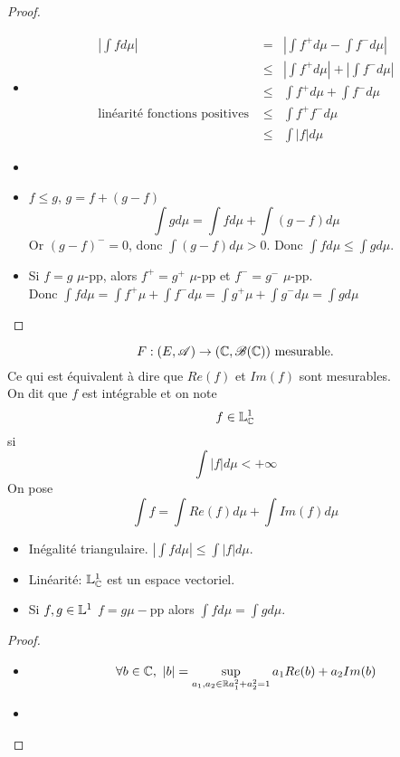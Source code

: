 \begin{proof}
	\begin{itemize}
		\item  \begin{eqnarray*}
			      |\int f d\mu| &=& \left|\int f^+ d\mu - \int f^- d\mu \right| \\
			      &\leq& \left|\int f^+ d\mu \right| + \left|\int f^- d\mu \right| \\
			      &\leq& \int f^+ d\mu + \int f^- d\mu  \\
			      \text{linéarité fonctions positives } &\leq& \int f^+ f^- d\mu  \\
			      &\leq& \int |f| d\mu
		      \end{eqnarray*}
		\item %
		\item $f \leq g$, $g = f + (g-f)$
		      $$\int g d\mu = \int f d\mu + \int (g-f) d \mu$$
		      Or $(g-f)^- = 0$, donc $\int (g-f) d\mu > 0$.
		      Donc $\int f d\mu \leq \int g d\mu$.
		\item Si $f = g$ $\mu$-pp, alors $f^+ = g^+$ $\mu$-pp et $f^- = g^-$ $\mu$-pp.\\
		      Donc $\int f d\mu = \int f^+ \mu + \int f^-  d\mu = \int g^+ \mu + \int g^-  d\mu = \int g d\mu$
	\end{itemize}
\end{proof}

\begin{definition}
	$$ F: (E, \mathscr{A}) \to (\mathbb{C}, \mathscr{B}(\mathbb{C})) \text{ mesurable.}$$
	Ce qui est équivalent à dire que $Re(f)$ et $Im(f)$ sont mesurables.\\
	On dit que $f$ est intégrable et on note
	$$ f\in \mathbb{L}^1_{\mathbb{C}}$$
	si $$\int |f| d\mu < +\infty$$
	On pose
	$$ \int f = \int Re(f) d\mu + \int Im(f) d\mu $$
\end{definition}


\begin{prop}
	\begin{itemize}
		\item Inégalité triangulaire. $\left| \int f d\mu \right| \leq \int |f| d \mu$.
		\item Linéarité: $\mathbb{L}^1_{\mathbb{C}}$ est un espace vectoriel.
		\item Si $f,g \in \mathbb{L}^1$ $f = g \mu-$pp alors $\int f d\mu = \int g d\mu$.
	\end{itemize}
\end{prop}


\begin{proof}
	\begin{itemize}
		\item $$\forall b \in \mathbb{C}, \ |b| = \sup_{a_1, a_2 \in \mathbb{R} \\ a_1^2 + a_2^2 = 1 } a_1 Re(b) + a_2 Im(b)$$
		\item
	\end{itemize}
\end{proof}



